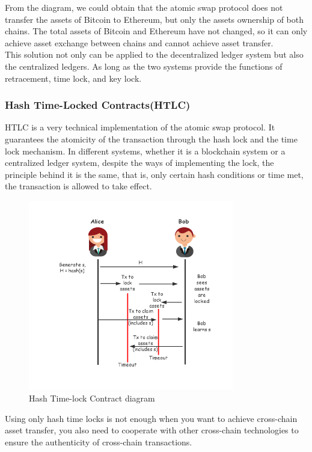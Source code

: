 \noindent From the diagram, we could obtain that the atomic swap protocol does not transfer the assets of Bitcoin to Ethereum, but only the assets ownership of both chains. The total assets of Bitcoin and Ethereum have not changed, so it can only achieve asset exchange between chains and cannot achieve asset transfer.\\
\noindent This solution not only can be applied to the decentralized ledger system but also the centralized ledgers. As long as the two systems provide the functions of retracement, time lock, and key lock.

\subsubsection{Hash Time-Locked Contracts(HTLC)}
\noindent HTLC is a very technical implementation of the atomic swap protocol. It guarantees the atomicity of the transaction through the hash lock and the time lock mechanism. In different systems, whether it is a blockchain system or a centralized ledger system, despite the ways of implementing the lock, the principle behind it is the same, that is, only certain hash conditions or time met, the transaction is allowed to take effect.

        \begin{figure}[H]
        \includegraphics[width=0.8\textwidth]{./figures/Hashlock.png}
        \centering
        \caption{Hash Time-lock Contract diagram}%
        \centering
        \label{fig:hash}
        \end{figure}
\noindent Using only hash time locks is not enough when you want to achieve cross-chain asset transfer, you also need to cooperate with other cross-chain technologies to ensure the authenticity of cross-chain transactions.


